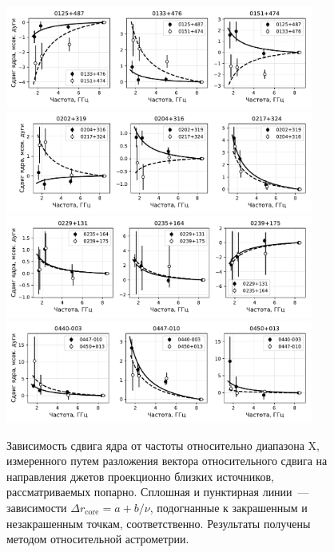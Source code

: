 \begin{figure}
 \centering
 \includegraphics[width=0.9\textwidth]{cs_vs_freq_using_jet_pa/cs_0}
 \includegraphics[width=0.9\textwidth]{cs_vs_freq_using_jet_pa/cs_1}
 \includegraphics[width=0.9\textwidth]{cs_vs_freq_using_jet_pa/cs_2}
 \includegraphics[width=0.9\textwidth]{cs_vs_freq_using_jet_pa/cs_3}
 \caption{Зависимость сдвига ядра от частоты относительно диапазона X, измеренного путем разложения
вектора относительного сдвига на направления джетов проекционно близких источников, рассматриваемых
попарно. Сплошная и пунктирная линии~--- зависимости $\Delta r_\mathrm{core} = a + b/\nu$,
подогнанные к закрашенным и незакрашенным точкам, соответственно. Результаты получены методом
относительной астрометрии.}
 \label{fig:cs_vs_freq_using_jet_pa}
\end{figure}

